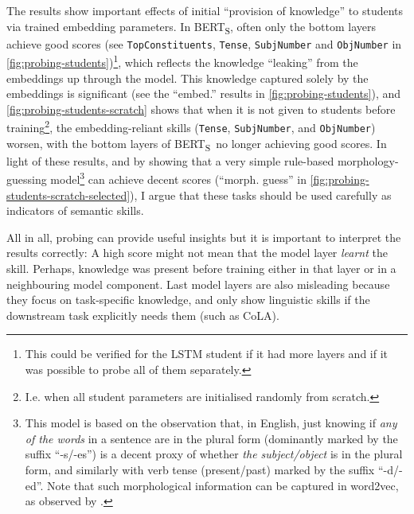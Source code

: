 \documentclass[bsc,frontabs,singlespacing,parskip,deptreport]{infthesis}
\def\BERTS{BERT\textsubscript{S}}
\begin{document}
{{    The results show important effects of initial ``provision of knowledge'' to students via trained embedding parameters.
    In \BERTS, often only the bottom layers achieve good scores (see \verb|TopConstituents|, \verb|Tense|, \verb|SubjNumber| and \verb|ObjNumber| in \autoref{fig:probing-students})\footnote{This could be verified for the LSTM student if it had more layers and if it was possible to probe all of them separately.}, which reflects the knowledge ``leaking'' from the embeddings up through the model.
    This knowledge captured solely by the embeddings is significant (see the ``embed.'' results in \autoref{fig:probing-students}), and \autoref{fig:probing-students-scratch} shows that when it is not given to students before training\footnote{I.e. when all student parameters are initialised randomly from scratch.}, the embedding-reliant skills (\verb|Tense|, \verb|SubjNumber|, and \verb|ObjNumber|) worsen, with the bottom layers of \BERTS~no longer achieving good scores.
    In light of these results, and by showing that a very simple rule-based morphology-guessing model\footnote{This model is based on the observation that, in English, just knowing if \textit{any of the words} in a sentence are in the plural form (dominantly marked by the suffix ``-s/-es'') is a decent proxy of whether \textit{the subject/object} is in the plural form, and similarly with verb tense (present/past) marked by the suffix ``-d/-ed''. Note that such morphological information can be captured in word2vec, as observed by \citet{Gieske_2017}.} can achieve decent scores (``morph. guess'' in \autoref{fig:probing-students-scratch-selected}), I argue that these tasks should be used carefully as indicators of semantic skills.    

    All in all, probing can provide useful insights but it is important to interpret the results correctly: A high score might not mean that the model layer \textit{learnt} the skill. Perhaps, knowledge was present before training either in that layer or in a neighbouring model component. Last model layers are also misleading because they focus on task-specific knowledge, and only show linguistic skills if the downstream task explicitly needs them (such as CoLA).
  }

}
\end{document}
